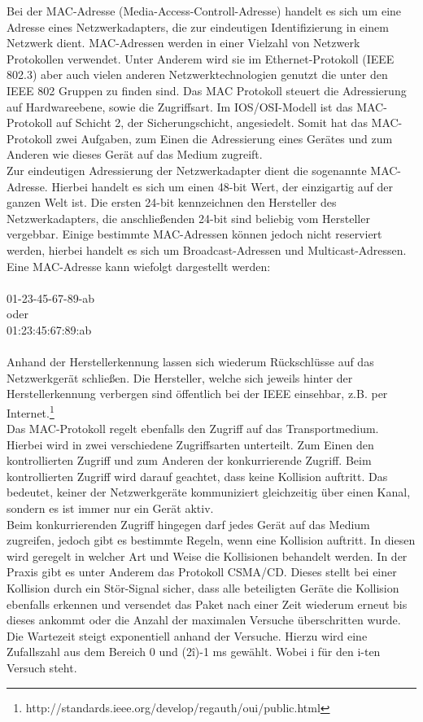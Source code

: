 Bei der MAC-Adresse (Media-Access-Controll-Adresse) handelt es sich um eine Adresse eines Netzwerkadapters, die zur eindeutigen Identifizierung in einem Netzwerk dient. MAC-Adressen werden in einer Vielzahl von Netzwerk Protokollen verwendet. Unter Anderem wird sie im Ethernet-Protokoll (IEEE 802.3)  aber auch vielen anderen Netzwerktechnologien genutzt die unter den IEEE 802 Gruppen zu finden sind.
Das MAC Protokoll steuert die Adressierung auf Hardwareebene, sowie die Zugriffsart.
Im IOS/OSI-Modell ist das MAC-Protokoll auf Schicht 2, der Sicherungschicht, angesiedelt.
Somit hat das MAC-Protokoll zwei Aufgaben, zum Einen die Adressierung eines Gerätes und zum Anderen wie dieses Gerät auf das Medium zugreift.\\
Zur eindeutigen Adressierung der Netzwerkadapter  dient die sogenannte MAC-Adresse. Hierbei handelt es sich um einen 48-bit Wert, der einzigartig auf der ganzen Welt ist. Die ersten 24-bit kennzeichnen den Hersteller des Netzwerkadapters, die anschließenden 24-bit sind beliebig vom Hersteller vergebbar. Einige bestimmte MAC-Adressen können jedoch nicht reserviert werden, hierbei handelt  es sich um Broadcast-Adressen und Multicast-Adressen.
Eine MAC-Adresse kann wiefolgt dargestellt werden:\\
\\
01-23-45-67-89-ab\\
oder\\
01:23:45:67:89:ab\\
\\
Anhand der Herstellerkennung lassen sich wiederum Rückschlüsse auf das Netzwerkgerät schließen. Die Hersteller, welche sich jeweils hinter der Herstellerkennung verbergen sind öffentlich bei der IEEE einsehbar, z.B. per Internet.\footnote{http://standards.ieee.org/develop/regauth/oui/public.html}\\
Das MAC-Protokoll regelt ebenfalls den Zugriff auf das Transportmedium. Hierbei wird in zwei verschiedene Zugriffsarten unterteilt. Zum Einen den kontrollierten Zugriff und zum Anderen der konkurrierende Zugriff.
Beim kontrollierten Zugriff wird darauf geachtet, dass keine Kollision auftritt. Das bedeutet, keiner der Netzwerkgeräte kommuniziert gleichzeitig über einen Kanal, sondern es ist immer nur ein Gerät aktiv.\\
Beim konkurrierenden Zugriff hingegen darf jedes Gerät auf das Medium zugreifen, jedoch gibt es bestimmte Regeln, wenn eine Kollision auftritt. In diesen wird geregelt in welcher Art und Weise die Kollisionen behandelt werden. In der Praxis gibt es unter Anderem das Protokoll CSMA/CD. Dieses stellt bei einer Kollision durch ein Stör-Signal sicher, dass alle beteiligten Geräte die Kollision ebenfalls erkennen und versendet das Paket nach einer Zeit wiederum erneut bis dieses ankommt oder die Anzahl der maximalen Versuche überschritten wurde. Die Wartezeit steigt exponentiell anhand der Versuche.
Hierzu wird eine Zufallszahl aus dem Bereich 0 und (2\^i)-1 ms gewählt.
Wobei i für den i-ten Versuch steht.


